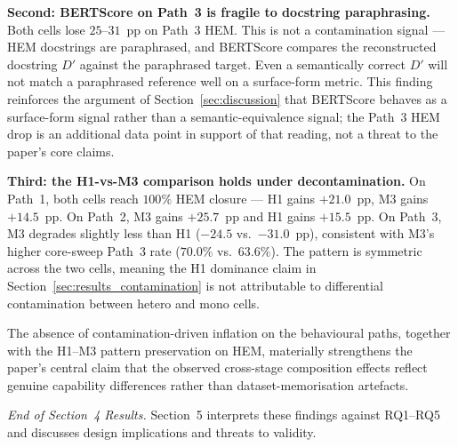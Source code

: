 \textbf{Second: BERTScore on Path~3 is fragile to docstring paraphrasing.} Both cells lose $25$--$31$~pp on Path~3 HEM. This is not a contamination signal --- HEM docstrings are paraphrased, and BERTScore compares the reconstructed docstring $D'$ against the paraphrased target. Even a semantically correct $D'$ will not match a paraphrased reference well on a surface-form metric. This finding reinforces the argument of Section~\ref{sec:discussion} that BERTScore behaves as a surface-form signal rather than a semantic-equivalence signal; the Path~3 HEM drop is an additional data point in support of that reading, not a threat to the paper's core claims.

\textbf{Third: the H1-vs-M3 comparison holds under decontamination.} On Path~1, both cells reach $100\%$ HEM closure --- H1 gains $+21.0$~pp, M3 gains $+14.5$~pp. On Path~2, M3 gains $+25.7$~pp and H1 gains $+15.5$~pp. On Path~3, M3 degrades slightly less than H1 ($-24.5$ vs.\ $-31.0$~pp), consistent with M3's higher core-sweep Path~3 rate ($70.0\%$ vs.\ $63.6\%$). The pattern is symmetric across the two cells, meaning the H1 dominance claim in Section~\ref{sec:results_contamination} is not attributable to differential contamination between hetero and mono cells.

The absence of contamination-driven inflation on the behavioural paths, together with the H1--M3 pattern preservation on HEM, materially strengthens the paper's central claim that the observed cross-stage composition effects reflect genuine capability differences rather than dataset-memorisation artefacts.


\emph{End of Section~4 Results.} Section~5 interprets these findings against RQ1--RQ5 and discusses design implications and threats to validity.
